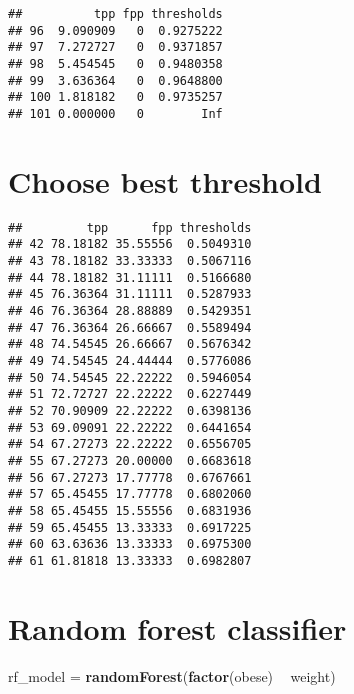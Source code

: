 \documentclass[]{article}
\newenvironment{Shaded}{\begin{snugshade}}{\end{snugshade}}
\newcommand{\KeywordTok}[1]{\textcolor[rgb]{0.13,0.29,0.53}{\textbf{#1}}}
\newcommand{\DecValTok}[1]{\textcolor[rgb]{0.00,0.00,0.81}{#1}}
\newcommand{\StringTok}[1]{\textcolor[rgb]{0.31,0.60,0.02}{#1}}
\newcommand{\OperatorTok}[1]{\textcolor[rgb]{0.81,0.36,0.00}{\textbf{#1}}}
\newcommand{\NormalTok}[1]{#1}
\begin{document}
\begin{verbatim}
##          tpp fpp thresholds
## 96  9.090909   0  0.9275222
## 97  7.272727   0  0.9371857
## 98  5.454545   0  0.9480358
## 99  3.636364   0  0.9648800
## 100 1.818182   0  0.9735257
## 101 0.000000   0        Inf
\end{verbatim}

\section{Choose best threshold}\label{choose-best-threshold}

\begin{Shaded}
\end{Shaded}

\begin{verbatim}
##         tpp      fpp thresholds
## 42 78.18182 35.55556  0.5049310
## 43 78.18182 33.33333  0.5067116
## 44 78.18182 31.11111  0.5166680
## 45 76.36364 31.11111  0.5287933
## 46 76.36364 28.88889  0.5429351
## 47 76.36364 26.66667  0.5589494
## 48 74.54545 26.66667  0.5676342
## 49 74.54545 24.44444  0.5776086
## 50 74.54545 22.22222  0.5946054
## 51 72.72727 22.22222  0.6227449
## 52 70.90909 22.22222  0.6398136
## 53 69.09091 22.22222  0.6441654
## 54 67.27273 22.22222  0.6556705
## 55 67.27273 20.00000  0.6683618
## 56 67.27273 17.77778  0.6767661
## 57 65.45455 17.77778  0.6802060
## 58 65.45455 15.55556  0.6831936
## 59 65.45455 13.33333  0.6917225
## 60 63.63636 13.33333  0.6975300
## 61 61.81818 13.33333  0.6982807
\end{verbatim}

\section{Random forest classifier}\label{random-forest-classifier}

\begin{Shaded}
\begin{Highlighting}[]
\NormalTok{rf_model =}\StringTok{ }\KeywordTok{randomForest}\NormalTok{(}\KeywordTok{factor}\NormalTok{(obese) }\OperatorTok{~}\StringTok{ }\NormalTok{weight)}
\end{Highlighting}
\end{Shaded}
\end{document}
